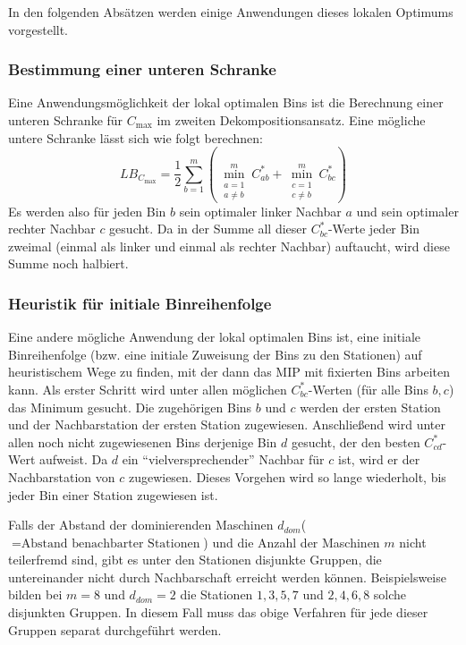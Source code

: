 \documentclass{scrreprt}
\begin{document}
In den folgenden Absätzen werden einige Anwendungen dieses lokalen Optimums vorgestellt.

\subsubsection{Bestimmung einer unteren Schranke}
Eine Anwendungsmöglichkeit der lokal optimalen Bins ist die Berechnung einer unteren Schranke für $C_{\max}$ im zweiten Dekompositionsansatz.
Eine mögliche untere Schranke lässt sich wie folgt berechnen:
\[LB_{C_{\max}} = \frac{1}{2} \sum_{b=1}^m \left( \min_{\substack{a=1\\a\neq b}}^m C_{ab}^* + \min_{\substack{c=1\\c\neq b}}^m C_{bc}^* \right) \]
Es werden also für jeden Bin $b$ sein optimaler linker Nachbar $a$ und sein optimaler rechter Nachbar $c$ gesucht.
Da in der Summe all dieser $C_{bc}^*$-Werte jeder Bin zweimal (einmal als linker und einmal als rechter Nachbar) auftaucht,
wird diese Summe noch halbiert.

\subsubsection{Heuristik für initiale Binreihenfolge}
Eine andere mögliche Anwendung der lokal optimalen Bins ist, eine initiale Binreihenfolge (bzw. eine initiale Zuweisung der Bins zu den Stationen)
auf heuristischem Wege zu finden, mit der dann das MIP mit fixierten Bins arbeiten kann.
Als erster Schritt wird unter allen möglichen $C_{bc}^*$-Werten (für alle Bins $b,c$) das Minimum gesucht.
Die zugehörigen Bins $b$ und $c$ werden der ersten Station und der Nachbarstation der ersten Station zugewiesen.
Anschließend wird unter allen noch nicht zugewiesenen Bins derjenige Bin $d$ gesucht, der den besten $C_{cd}^*$-Wert aufweist.
Da $d$ ein "`vielversprechender"' Nachbar für $c$ ist, wird er der Nachbarstation von $c$ zugewiesen.
Dieses Vorgehen wird so lange wiederholt, bis jeder Bin einer Station zugewiesen ist.

Falls der Abstand der dominierenden Maschinen $d_{\mathit{dom}}$($=\text{Abstand benachbarter Stationen}$) und die Anzahl der Maschinen $m$ nicht teilerfremd sind,
gibt es unter den Stationen disjunkte Gruppen, die untereinander nicht durch Nachbarschaft erreicht werden können.
Beispielsweise bilden bei $m=8$ und $d_{\mathit{dom}}=2$ die Stationen $1,3,5,7$ und $2,4,6,8$ solche disjunkten Gruppen.
In diesem Fall muss das obige Verfahren für jede dieser Gruppen separat durchgeführt werden.
\end{document}
